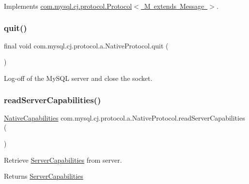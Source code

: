 Implements \mbox{\hyperlink{interfacecom_1_1mysql_1_1cj_1_1protocol_1_1_protocol}{com.\+mysql.\+cj.\+protocol.\+Protocol$<$ M extends Message $>$}}.

\mbox{\label{classcom_1_1mysql_1_1cj_1_1protocol_1_1a_1_1_native_protocol_a068e7a1606a75477e944516d5888ef2a}} 
\subsubsection{\texorpdfstring{quit()}{quit()}}
{\footnotesize\ttfamily final void com.\+mysql.\+cj.\+protocol.\+a.\+Native\+Protocol.\+quit (\begin{DoxyParamCaption}{ }\end{DoxyParamCaption})}

Log-\/off of the My\+S\+QL server and close the socket. \mbox{\label{classcom_1_1mysql_1_1cj_1_1protocol_1_1a_1_1_native_protocol_acfce17a81631146efc0ca8d9cef22880}} 
\subsubsection{\texorpdfstring{read\+Server\+Capabilities()}{readServerCapabilities()}}
{\footnotesize\ttfamily \mbox{\hyperlink{classcom_1_1mysql_1_1cj_1_1protocol_1_1a_1_1_native_capabilities}{Native\+Capabilities}} com.\+mysql.\+cj.\+protocol.\+a.\+Native\+Protocol.\+read\+Server\+Capabilities (\begin{DoxyParamCaption}{ }\end{DoxyParamCaption})}

Retrieve \mbox{\hyperlink{interfacecom_1_1mysql_1_1cj_1_1protocol_1_1_server_capabilities}{Server\+Capabilities}} from server.

\begin{DoxyReturn}{Returns}
\mbox{\hyperlink{interfacecom_1_1mysql_1_1cj_1_1protocol_1_1_server_capabilities}{Server\+Capabilities}} 
\end{DoxyReturn}


